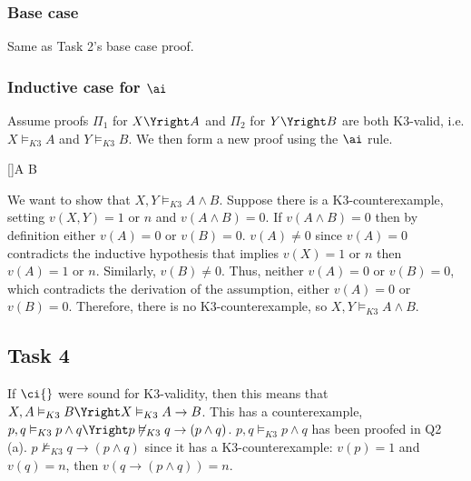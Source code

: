 \subsubsection*{Base case}
Same as Task 2's base case proof.

\subsubsection*{Inductive case for $\ai$}
Assume proofs $\Pi_1$ for $X \Yright A$ and $\Pi_2$ for $Y \Yright B$ are both K3-valid, i.e. $X \vDash_{K3} A$ and $Y \vDash_{K3} B$. We then form a new proof using the $\ai$ rule.
\begin{prooftree*}
[\ai]{A \land B}
\end{prooftree*}
We want to show that $X,Y \vDash_{K3} A \land B$. Suppose there is a K3-counterexample, setting $v(X, Y) = 1$ or $n$ and $v(A \land B) = 0$. If $v(A \land B) = 0$ then by definition either $v(A) = 0$ or $v(B) = 0$. $v(A) \not = 0$ since $v(A) = 0$ contradicts the inductive hypothesis that implies $v(X) = 1$ or $n$ then $v(A) = 1$ or $n$. Similarly, $v(B) \not = 0$. Thus, neither $v(A) = 0$ or $v(B) = 0$, which contradicts the derivation of the assumption, either $v(A) = 0$ or $v(B) = 0$. Therefore, there is no K3-counterexample, so $X,Y \vDash_{K3} A \land B$.

\subsection*{Task 4}
If $\ci{}$ were sound for K3-validity, then this means that $X,A \vDash_{K3} B \Yright X \vDash_{K3} A \to B$. This has a counterexample, $p,q \vDash_{K3} p \land q \Yright p \not\vDash_{K3} q \to (p \land q)$. $p,q \vDash_{K3} p \land q$ has been proofed in Q2 (a). $p \not\vDash_{K3} q \to (p \land q)$ since it has a K3-counterexample: $v(p) = 1$ and $v(q) = n$, then $v(q \to (p \land q)) = n$.
